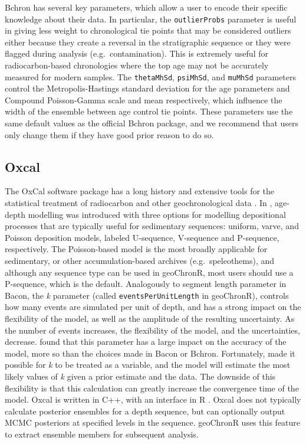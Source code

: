 \documentclass[gchron, manuscript]{copernicus}
\begin{document}
Bchron has several key parameters, which allow a user to encode their
specific knowledge about their data. In particular, the
\texttt{outlierProbs} parameter is useful in giving less weight to
chronological tie points that may be considered outliers either because
they create a reversal in the stratigraphic sequence or they were
flagged during analysis (e.g.~contamination). This is extremely useful
for radiocarbon-based chronologies where the top age may not be
accurately measured for modern samples. The \texttt{thetaMhSd},
\texttt{psiMhSd}, and \texttt{muMhSd} parameters control the
Metropolis-Hastings standard deviation for the age parameters and
Compound Poisson-Gamma scale and mean respectively, which influence the
width of the ensemble between age control tie points. These parameters
use the same default values as the official Bchron package, and we
recommend that users only change them if they have good prior reason to
do so.

\subsection{Oxcal}

The OxCal software package has a long history and extensive tools for
the statistical treatment of radiocarbon and other geochronological data
\citep{BronkRamsey95}. In \citet{ramsey2008deposition}, age-depth
modelling was introduced with three options for modelling depositional
processes that are typically useful for sedimentary sequences: uniform,
varve, and Poisson deposition models, labeled U-sequence, V-sequence and
P-sequence, respectively. The Poisson-based model is the most broadly
applicable for sedimentary, or other accumulation-based archives
(e.g.~speleothems), and although any sequence type can be used in
geoChronR, most users should use a P-sequence, which is the default.
Analogously to segment length parameter in Bacon, the \emph{k} parameter
(called \texttt{eventsPerUnitLength} in geoChronR), controls how many
events are simulated per unit of depth, and has a strong impact on the
flexibility of the model, as well as the amplitude of the resulting
uncertainty. As the number of events increases, the flexibility of the
model, and the uncertainties, decrease. \citet{trachsel2017} found that
this parameter has a large impact on the accuracy of the model, more so
than the choices made in Bacon or Bchron. Fortunately,
\citet{bronkramsey2010} made it possible for \emph{k} to be treated as a
variable, and the model will estimate the most likely values of \emph{k}
given a prior estimate and the data. The downside of this flexibility is
that this calculation can greatly increase the convergence time of the
model. Oxcal is written in C++, with an interface in R \citep{oxcAAR}.
Oxcal does not typically calculate posterior ensembles for a depth
sequence, but can optionally output MCMC posteriors at specified levels
in the sequence. geoChronR uses this feature to extract ensemble members
for subsequent analysis.
\end{document}
